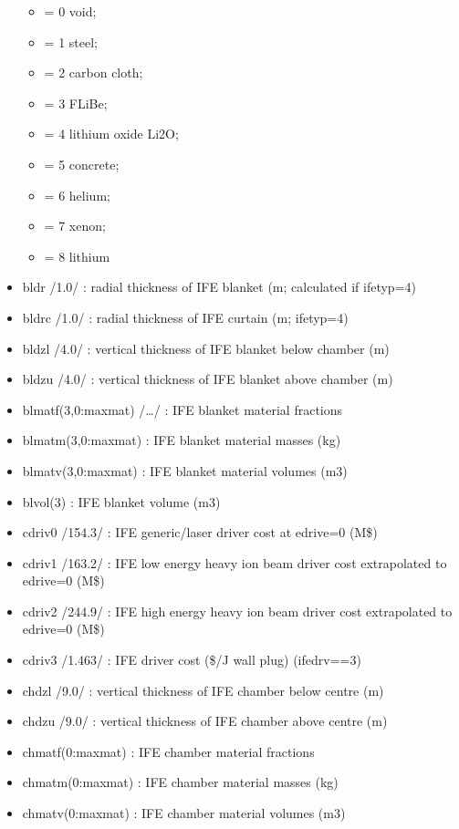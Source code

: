 \documentclass[]{article}
\providecommand{\tightlist}{%
  \setlength{\itemsep}{0pt}\setlength{\parskip}{0pt}}
\begin{document}
\begin{itemize}
  \begin{itemize}
  \tightlist
  \item
    = 0 void;
  \item
    = 1 steel;
  \item
    = 2 carbon cloth;
  \item
    = 3 FLiBe;
  \item
    = 4 lithium oxide Li2O;
  \item
    = 5 concrete;
  \item
    = 6 helium;
  \item
    = 7 xenon;
  \item
    = 8 lithium
  \end{itemize}
\item
  bldr /1.0/ : radial thickness of IFE blanket (m; calculated if
  ifetyp=4)
\item
  bldrc /1.0/ : radial thickness of IFE curtain (m; ifetyp=4)
\item
  bldzl /4.0/ : vertical thickness of IFE blanket below chamber (m)
\item
  bldzu /4.0/ : vertical thickness of IFE blanket above chamber (m)
\item
  blmatf(3,0:maxmat) /\ldots{}/ : IFE blanket material fractions
\item
  blmatm(3,0:maxmat) : IFE blanket material masses (kg)
\item
  blmatv(3,0:maxmat) : IFE blanket material volumes (m3)
\item
  blvol(3) : IFE blanket volume (m3)
\item
  cdriv0 /154.3/ : IFE generic/laser driver cost at edrive=0 (M\$)
\item
  cdriv1 /163.2/ : IFE low energy heavy ion beam driver cost
  extrapolated to edrive=0 (M\$)
\item
  cdriv2 /244.9/ : IFE high energy heavy ion beam driver cost
  extrapolated to edrive=0 (M\$)
\item
  cdriv3 /1.463/ : IFE driver cost (\$/J wall plug) (ifedrv==3)
\item
  chdzl /9.0/ : vertical thickness of IFE chamber below centre (m)
\item
  chdzu /9.0/ : vertical thickness of IFE chamber above centre (m)
\item
  chmatf(0:maxmat) : IFE chamber material fractions
\item
  chmatm(0:maxmat) : IFE chamber material masses (kg)
\item
  chmatv(0:maxmat) : IFE chamber material volumes (m3)

\end{itemize}
\end{document}
